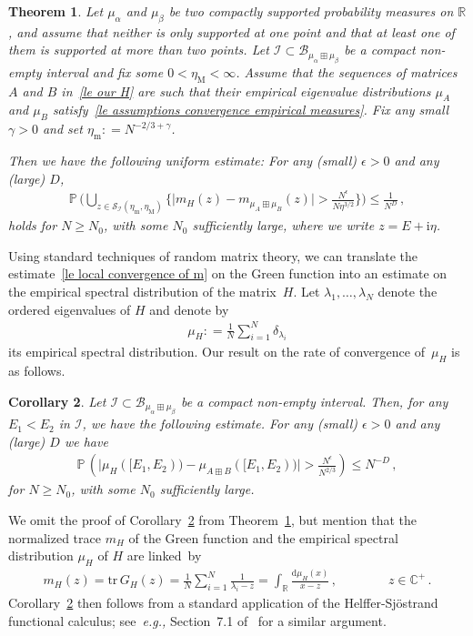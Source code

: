 \documentclass[10pt,reqno]{amsart}
\numberwithin{equation}{section}
\theoremstyle{plain}
\newtheorem{theorem}{Theorem}[section]
\newtheorem{corollary}[theorem]{Corollary}
\numberwithin{kevin}{section}
\theoremstyle{remark}
\newcommand{\R}{{\mathbb R }}
\renewcommand{\P}{{\mathbb P}}
\newcommand{\C}{{\mathbb C}}
\newcommand{\ii}{\mathrm{i}}
\newcommand{\deq}{\mathrel{\mathop:}=}
\newcommand{\ntr}{\mathrm{tr}\,}
\newcommand{\dd}{\mathrm{d}}
\newcommand{\eg}{\emph{e.g., }}
\begin{document}
\begin{theorem} \label{thm041801}
Let $\mu_\alpha$ and $\mu_\beta$ be two compactly supported probability measures on $\R$, and assume that neither is only supported at one point and that at least one of them is supported at more than two points. Let $\mathcal{I}\subset\mathcal{B}_{\mu_\alpha\boxplus\mu_\beta}$ be a compact non-empty interval and fix some $0<\eta_{\mathrm{M}}<\infty$. Assume that the sequences of matrices $A$ and $B$ in~\eqref{le our H} are such that their empirical eigenvalue distributions $\mu_A$ and $\mu_B$ satisfy~\eqref{le assumptions convergence empirical measures}. Fix any small $\gamma>0$ and set $\eta_\mathrm{m}\deq N^{-2/3+\gamma}$.

 Then we have the following uniform estimate: For any (small) $\epsilon>0$ and any (large) $D$,
\begin{align}\label{le local convergence of m}
\mathbb{P}\,\bigg(\bigcup_{z\in\mathcal{S}_{\mathcal{I}}(\eta_\mathrm{m},\eta_{\mathrm{M}})}\bigg\{\big|m_H(z)-m_{\mu_A\boxplus \mu_B}(z)\big|> \frac{N^{\epsilon}}{N\eta^{3/2}}\bigg\}\bigg)\le \frac{1}{N^D}\,,
\end{align}
holds for $N\ge N_0$, with some $N_0$ sufficiently large, where we write $z=E+\ii\eta$.

\end{theorem}
Using standard techniques of random matrix theory, we can translate the estimate~\eqref{le local convergence of m} on the Green function into an estimate on the empirical spectral distribution of the matrix~$H$. Let $\lambda_1,\ldots,\lambda_N$ denote the ordered eigenvalues of $H$ and denote by
\begin{align}\label{le empirical distribution lambdas}
 \mu_H\deq \frac{1}{N}\sum_{i=1}^N\delta_{\lambda_i}
\end{align}
its empirical spectral distribution. Our result on the rate of convergence of~$\mu_H$ is as follows.	

\begin{corollary}\label{cor081801}
Let $\mathcal{I}\subset\mathcal{B}_{\mu_\alpha\boxplus\mu_\beta}$ be a compact non-empty interval. Then, for any $E_1<E_2$ in $\mathcal{I}$, we have the following estimate. For any (small) $\epsilon>0$ and any (large) $D$ we have
\begin{align}
\P\,\left(\Big|\mu_H([E_1,E_2))-\mu_{A\boxplus B}([E_1,E_2))  \Big|> \frac{N^\epsilon}{N^{2/3}}\right)\le N^{-D}\,,
\end{align}
for $N\ge N_0$, with some $N_0$ sufficiently large.
\end{corollary}
We omit the proof of Corollary~\ref{cor081801} from Theorem~\ref{thm041801}, but mention that the normalized trace $m_H$ of the Green function and the empirical spectral distribution $\mu_H$ of $H$ are linked~by
\begin{align*}
 m_H(z)=\ntr G_H(z)=\frac{1}{N}\sum_{i=1}^N\frac{1}{\lambda_i-z}=\int_\R\frac{\dd\mu_H(x)}{x-z}\,,\qquad \qquad z\in\C^+\,.
\end{align*}
Corollary~\ref{cor081801} then follows from a standard application of the Helffer-Sj\"{o}strand functional calculus; see~\eg Section~7.1 of~\cite{EKYY13} for a similar argument.
\end{document}
